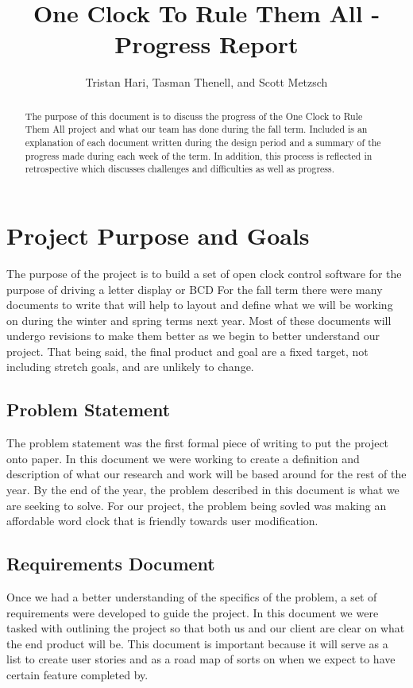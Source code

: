 \documentclass[10pt,draftclsnofoot,onecolumn]{IEEEtran}
\begin{document}
\title{One Clock To Rule Them All - Progress Report}
\author{Tristan Hari, Tasman Thenell, and Scott Metzsch}
\maketitle
\begin{abstract}
The purpose of this document is to discuss the progress of the One Clock to Rule Them All project and what our team has done during the fall term.
Included is an explanation of each document written during the design period and a summary of the progress made during each week of the term.
In addition, this process is reflected in retrospective which discusses challenges and difficulties as well as progress.
\end{abstract}

\newpage

\section{Project Purpose and Goals}
The purpose of the project is to build a set of open clock control software for the purpose of driving a letter display or BCD 
For the fall term there were many documents to write that will help to layout and define what we will be working on during the winter and spring terms next year.
Most of these documents will undergo revisions to make them better as we begin to better understand our project. 
That being said, the final product and goal are a fixed target, not including stretch goals, and are unlikely to change. 
\subsection{Problem Statement}
The problem statement was the first formal piece of writing to put the project onto paper. 
In this document we were working to create a definition and description of what our research and work will be based around for the rest of the year. 
By the end of the year, the problem described in this document is what we are seeking to solve.
For our project, the problem being sovled was making an affordable word clock that is friendly towards user modification.
\subsection{Requirements Document}
Once we had a better understanding of the specifics of the problem, a set of requirements were developed to guide the project.
In this document we were tasked with outlining the project so that both us and our client are clear on what the end product will be.
This document is important because it will serve as a list to create user stories and as a road map of sorts on when we expect to have certain feature completed by. 
\end{document}
